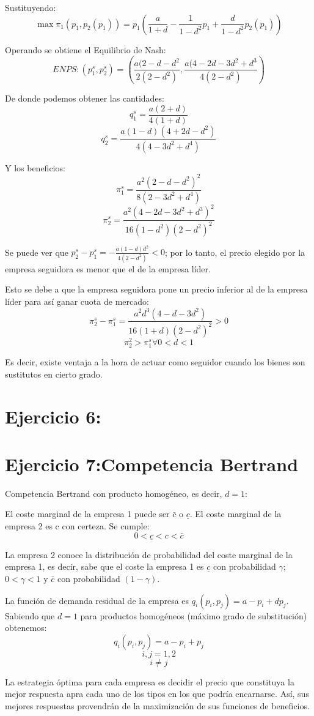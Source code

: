 \documentclass{article}
\theoremstyle{definition}
\theoremstyle{remark}
\begin{document}
Sustituyendo:
$$\max\pi_1(p_1,p_2(p_1))=p_1(\frac{a}{1+d}-\frac{1}{1-d^2}p_1+\frac{d}{1-d^2}p_2(p_1))$$

Operando se obtiene el Equilibrio de Nash:
$$ENPS:(p_1^s,p_2^s)=(\frac{a(2-d-d^2}{2(2-d^2)},\frac{a(4-2d-3d^2+d^3}{4(2-d^2)})$$

De donde podemos obtener las cantidades:
$$q_1^s=\frac{a(2+d)}{4(1+d)}$$
$$q_2^s=\frac{a(1-d)(4+2d-d^2)}{4(4-3d^2+d^4)}$$

Y los beneficios:
$$\pi_1^s=\frac{a^2(2-d-d^2)^2}{8(2-3d^2+d^4)}$$
$$\pi_2^s=\frac{a^2(4-2d-3d^2+d^3)^2}{16(1-d^2)(2-d^2)^2}$$

Se puede ver que $p_2^s-p_1^s=-\frac{a(1-d)d^2}{4(2-d^2)}<0$; por lo tanto, el precio elegido por la empresa seguidora es menor que el de la empresa l\'ider.


Esto se debe a que la empresa seguidora pone un precio inferior al de la empresa l\'ider para as\'i ganar cuota de mercado:
$$\pi_2^s-\pi_1^s=\frac{a^2d^3(4-d-3d^2)}{16(1+d)(2-d^2)^2}>0$$
$$\pi_2^2>\pi_1^s   \forall   0<d<1$$

Es decir, existe ventaja a la hora de actuar como seguidor cuando los bienes son sustitutos en cierto grado.

\section{Ejercicio 6:}
\section{Ejercicio 7:Competencia Bertrand}

Competencia Bertrand con producto homog\'eneo, es decir, $d=1$:

El coste marginal de la empresa 1 puede ser $\bar{c}$ o $\underline{c}$.
El coste marginal de la empresa 2 es c con certeza.
Se cumple:
$$0<\underline{c}<c<\bar{c}$$

La empresa 2 conoce la distribuci\'on de probabilidad del coste marginal de la empresa 1, es decir, sabe que el coste la empresa 1 es $\underline{c}$ con probabilidad $\gamma$; $0<\gamma<1$ y $\bar{c}$ con probabilidad $(1-\gamma)$.

La funci\'on de demanda residual de la empresa es $q_i(p_i,p_j)=a-p_i+dp_j$. Sabiendo que $d=1$ para productos homog\'eneos (m\'aximo grado de substituci\'on) obtenemos:
$$q_i(p_i,p_j)=a-p_i+p_j$$ $$i,j=1,2$$ $$i\neq j$$

La estrategia \'optima para cada empresa es decidir el precio que constituya la mejor respuesta apra cada uno de los tipos  en los que podr\'ia encarnarse. As\'i, sus mejores respuestas provendr\'an de la maximizaci\'on de sus funciones de beneficios.
\end{document}
